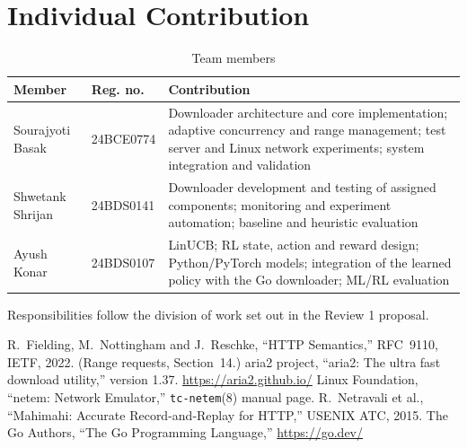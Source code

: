 \documentclass[11pt,a4paper]{report}
\newcommand{\MemberA}{Sourajyoti Basak} \newcommand{\RegA}{24BCE0774}
\newcommand{\MemberB}{Shwetank Shrijan} \newcommand{\RegB}{24BDS0141}
\newcommand{\MemberC}{Ayush Konar} \newcommand{\RegC}{24BDS0107}
\newcommand{\code}[1]{\texttt{#1}}
\begin{document}
\chapter{Individual Contribution}
\begin{table}[H]\centering
\caption{Team members}\label{tab:team}
\begin{tabularx}{\linewidth}{@{}p{3.2cm}p{2.1cm}L@{}}
\toprule
\textbf{Member} & \textbf{Reg. no.} & \textbf{Contribution}\\
\midrule
\MemberA & \RegA & Downloader architecture and core implementation; adaptive concurrency and range management; test server and Linux network experiments; system integration and validation\\
\MemberB & \RegB & Downloader development and testing of assigned components; monitoring and experiment automation; baseline and heuristic evaluation\\
\MemberC & \RegC & LinUCB; RL state, action and reward design; Python/PyTorch models; integration of the learned policy with the Go downloader; ML/RL evaluation\\
\bottomrule
\end{tabularx}
\end{table}

Responsibilities follow the division of work set out in the Review 1 proposal.

\begin{thebibliography}{9}
 R.~Fielding, M.~Nottingham and J.~Reschke, ``HTTP Semantics,'' RFC~9110, IETF, 2022. (Range requests, Section~14.)
 aria2 project, ``aria2: The ultra fast download utility,'' version 1.37. \url{https://aria2.github.io/}
 Linux Foundation, ``netem: Network Emulator,'' \code{tc-netem}(8) manual page.
 R.~Netravali et al., ``Mahimahi: Accurate Record-and-Replay for HTTP,'' USENIX ATC, 2015.
 The Go Authors, ``The Go Programming Language,'' \url{https://go.dev/}
\end{thebibliography}
\end{document}
